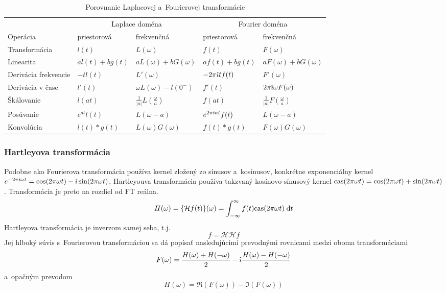 \begin{table}[htp]
    \centering 
    \renewcommand{\arraystretch}{1.5}
    \begin{tabular}{l l l l l}
    & \multicolumn{2}{c}{Laplace doména}
    & \multicolumn{2}{c}{Fourier doména} \\
    Operácia & priestorová& frekvenčná&
        priestorová & frekvenčná \\
    Transformácia &
        $l(t)$ & $L(\omega)$ &
        $f(t)$ & $F(\omega)$ \\
    Linearita &
        $a l(t) + b g(t)$ & $a L(\omega) + b G(\omega)$ &
        $a f(t) + b g(t)$ & $a F(\omega) + b G(\omega)$ \\
    Derivácia frekvencie &
        $-t l(t)$ & $L'(\omega)$ &
        $-2\pi\hat{\imath} t f(t) $ & $F'(\omega)$\\
    Derivácia v čase &
        $l'(t)$ & $\omega L(\omega) - l(0^{-})$ &
        $f'(t)$ & $2\pi\hat{\imath}\omega F(\omega)$\\
    Škálovanie &
        $l(at)$ & $\frac{1}{|a|} L(\frac{\omega}{a})$ &
        $f(at)$ & $\frac{1}{|a|} F(\frac{\omega}{a})$\\
    Posúvanie &
        $e^{a t} l(t)$ & $L(\omega -a)$ &
        $e^{2\pi\hat{\imath} at} f(t)$ & $L(\omega - a)$\\
    Konvolúcia &
        $l(t)*g(t)$ & $L(\omega)G(\omega)$ &
        $f(t)*g(t)$ & $F(\omega)G(\omega)$
    \end{tabular}
    \label{tab:laplace_vs_fourier}
    \caption{Porovnanie Laplacovej a~Fourierovej transformácie}
    \renewcommand{\arraystretch}{1.0}
\end{table}

\subsubsection{Hartleyova transformácia}
Podobne ako Fourierova transformácia používa kernel zložený zo sínusov
a~kosínusov, konkrétne exponenciálny kernel $e^{-2\pi \hat{\imath}\omega t}=
\cos(2\pi \omega t) -\hat{\imath} \sin(2 \pi \omega t)$, Hartleyouva
transformácia používa takzvaný kosínovo-sínusový kernel
\newcommand{\cas}{{\rm cas}}
$\cas(2 \pi \omega t)=\cos(2 \pi \omega t) + \sin(2 \pi \omega t)$.
Transformácia je preto na rozdiel od FT reálna.
\begin{equation*}
 H(\omega) = \{\mathcal{H} f(t)\}(\omega) =
    \intinfinf f(t) \cas(2 \pi \omega t) \dd t
\end{equation*}
%
Hartleyova transformácia je inverzom samej seba, t.j.
\begin{equation*}
    f = \mathcal{H}\mathcal{H} f
\end{equation*}
%
Jej hlboký súvis s~Fourierovou transformáciou sa dá popísať
nasledujúcimi prevodnými rovnicami medzi oboma transformáciami
%
\begin{equation*}
    F(\omega) = \frac{H(\omega)+H(-\omega)}{2} 
                -\hat{\imath} \frac{H(\omega) - H(-\omega)}{2}
\end{equation*}
a~opačným prevodom
\begin{equation*}
 H(\omega) = \Re(F(\omega)) - \Im(F(\omega))
\end{equation*}

